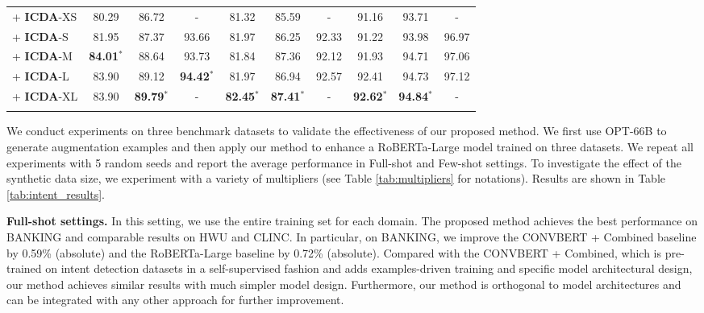 \documentclass[11pt]{article}
\begin{document}
\begin{table*}[t!]
\begin{tabular}{lccccccccc}
\quad + \textbf{ICDA}-XS  & 80.29 & 86.72 & - & 81.32 & 85.59 & - & 91.16 & 93.71 & - \\
                        \quad + \textbf{ICDA}-S  & 81.95 & 87.37 & 93.66 & 81.97 & 86.25 & 92.33 & 91.22 & 93.98 & 96.97 \\
                        \quad + \textbf{ICDA}-M & \textbf{84.01$^*$} & 88.64 & 93.73 & 81.84 & 87.36 & 92.12 & 91.93 & 94.71 & 97.06 \\
                        \quad + \textbf{ICDA}-L & 83.90 & 89.12 & \textbf{94.42$^*$} & 81.97 &  86.94 & 92.57 & 92.41 & 94.73 & 97.12 \\
                        \quad + \textbf{ICDA}-XL & 83.90 & \textbf{89.79$^*$} & - & \textbf{82.45$^*$} & \textbf{87.41$^*$} & - & \textbf{92.62$^*$} & \textbf{94.84$^*$} & -\\
\Xhline{2\arrayrulewidth}
\end{tabular}
\caption{Intent Detection Accuracy (in \%) in few-/full-shot settings with augmented data from OPT-66B. Numbers in bold are the best results and numbers with $^*$ are statistically significant by t-test  ($p<0.05$) compared to the baselines (\textbf{5} / \textbf{10} examples per intent).}
\label{tab:intent_results}
\end{table*}

We conduct experiments on three benchmark datasets to validate the effectiveness of our proposed method. 
We first use OPT-66B to generate augmentation examples and then apply our method to enhance a RoBERTa-Large model trained on three datasets. 
We repeat all experiments with 5 random seeds and report the average performance in Full-shot and Few-shot settings. To investigate the effect of the synthetic data size, we experiment with a variety of multipliers (see Table \ref{tab:multipliers} for notations).
Results are shown in Table \ref{tab:intent_results}.

\textbf{Full-shot settings.}
In this setting, we use the entire training set for each domain.
The proposed method  achieves the best performance on BANKING and comparable results on HWU and CLINC.
In particular, on BANKING, we improve the C{\small ONV}BERT + Combined baseline \cite{mehri-eric-2021-example} by 0.59\% (absolute) and the RoBERTa-Large baseline by 0.72\% (absolute).
Compared with the C{\small ONV}BERT + Combined, which is pre-trained on intent detection datasets in a self-supervised fashion and adds examples-driven training and specific model architectural design, our method achieves similar results with much simpler model design. 
Furthermore, our method is orthogonal to model architectures and can be integrated with any other approach for further improvement.
\end{document}
